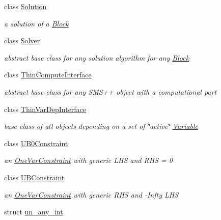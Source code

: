 \begin{DoxyCompactItemize}
class \mbox{\hyperlink{class_s_m_spp__di__unipi__it_1_1_solution}{Solution}}
\begin{DoxyCompactList}\small\item\em a solution of a \mbox{\hyperlink{class_s_m_spp__di__unipi__it_1_1_block}{Block}} \end{DoxyCompactList}\item 
class \mbox{\hyperlink{class_s_m_spp__di__unipi__it_1_1_solver}{Solver}}
\begin{DoxyCompactList}\small\item\em abstract base class for any solution algorithm for any \mbox{\hyperlink{class_s_m_spp__di__unipi__it_1_1_block}{Block}} \end{DoxyCompactList}\item 
class \mbox{\hyperlink{class_s_m_spp__di__unipi__it_1_1_thin_compute_interface}{Thin\+Compute\+Interface}}
\begin{DoxyCompactList}\small\item\em abstract base class for any S\+M\+S++ object with a computational part \end{DoxyCompactList}\item 
class \mbox{\hyperlink{class_s_m_spp__di__unipi__it_1_1_thin_var_dep_interface}{Thin\+Var\+Dep\+Interface}}
\begin{DoxyCompactList}\small\item\em base class of all objects depending on a set of \char`\"{}active\char`\"{} \mbox{\hyperlink{class_s_m_spp__di__unipi__it_1_1_variable}{Variable}} \end{DoxyCompactList}\item 
class \mbox{\hyperlink{class_s_m_spp__di__unipi__it_1_1_u_b0_constraint}{U\+B0\+Constraint}}
\begin{DoxyCompactList}\small\item\em an \mbox{\hyperlink{class_s_m_spp__di__unipi__it_1_1_one_var_constraint}{One\+Var\+Constraint}} with generic L\+HS and R\+HS = 0 \end{DoxyCompactList}\item 
class \mbox{\hyperlink{class_s_m_spp__di__unipi__it_1_1_u_b_constraint}{U\+B\+Constraint}}
\begin{DoxyCompactList}\small\item\em an \mbox{\hyperlink{class_s_m_spp__di__unipi__it_1_1_one_var_constraint}{One\+Var\+Constraint}} with generic R\+HS and -\/\+Infty L\+HS \end{DoxyCompactList}\item 
struct \mbox{\hyperlink{struct_s_m_spp__di__unipi__it_1_1un__any__int}{un\+\_\+any\+\_\+int}}

\end{DoxyCompactItemize}
